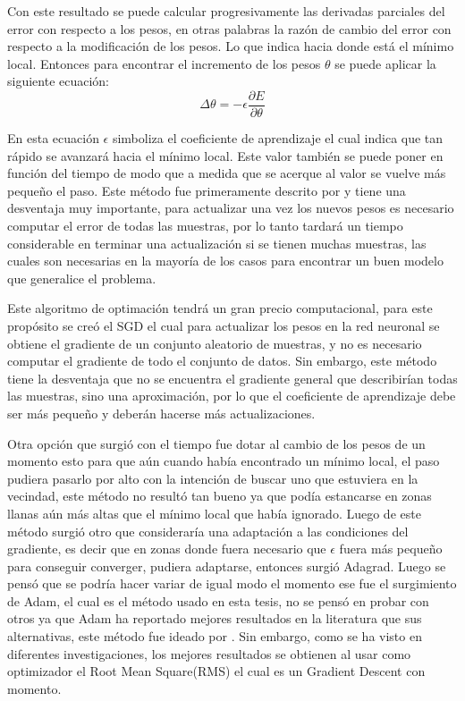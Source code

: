 \par Con este resultado se puede calcular progresivamente las derivadas parciales del error con respecto a los pesos, en otras palabras la razón de cambio del error con respecto a la modificación de los pesos. Lo que indica hacia donde está el mínimo local. Entonces para encontrar el incremento de los pesos $\theta$ se puede aplicar la siguiente ecuación:
\[ \Delta \theta =-\epsilon \frac{\partial E}{\partial \theta }\]

\par En esta ecuación $\epsilon$ simboliza el coeficiente de aprendizaje el cual indica que tan rápido se avanzará hacia el mínimo local. Este valor también se puede poner en función del tiempo de modo que a medida que se acerque al valor se vuelve más pequeño el paso. Este método fue primeramente descrito por \textcite{rumelhart1986learning} y tiene una desventaja muy importante, para actualizar una vez los nuevos pesos es necesario computar el error de todas las muestras, por lo tanto tardará un tiempo considerable en terminar una actualización si se tienen muchas muestras, las cuales son necesarias en la mayoría de los casos para encontrar un buen modelo que generalice el problema.

\par Este algoritmo de optimación tendrá un gran precio computacional, para este propósito se creó el \gls{SGD} el cual para actualizar los pesos en la red neuronal se obtiene el gradiente de un conjunto aleatorio de muestras, y no es necesario computar el gradiente de todo el conjunto de datos. Sin embargo, este método tiene la desventaja que no se encuentra el gradiente general que describirían todas las muestras, sino una aproximación, por lo que el coeficiente de aprendizaje debe ser más pequeño y deberán hacerse más actualizaciones.

\par Otra opción que surgió con el tiempo fue dotar al cambio de los pesos de un momento esto para que aún cuando había encontrado un mínimo local, el paso pudiera pasarlo por alto con la intención de buscar uno que estuviera en la vecindad, este método no resultó tan bueno ya que podía estancarse en zonas llanas aún más altas que el mínimo local que había ignorado. Luego de este método surgió otro que consideraría una adaptación a las condiciones del gradiente, es decir que en zonas donde fuera necesario que $\epsilon$ fuera más pequeño para conseguir converger, pudiera adaptarse, entonces surgió Adagrad. Luego se pensó que se podría hacer variar de igual modo el momento ese fue el surgimiento de Adam, el cual es el método usado en esta tesis, no se pensó en probar con otros ya que Adam ha reportado mejores resultados en la literatura que sus alternativas, este método fue ideado por \textcite{kingma2014adam}.  Sin embargo, como se ha visto en diferentes investigaciones, los mejores resultados se obtienen al usar como optimizador el Root Mean Square(RMS) el cual es un Gradient Descent con momento.
\nocite{DBLP:journals/corr/Ruder16}

